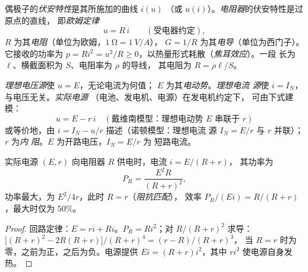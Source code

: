 \begin{definition}\label{def:b1:dc-circuits:resistor}
偶极子的\emph{伏安特性}是其所施加的曲线 $i(u)$
（或 $u(i)$）。\emph{电阻器}的伏安特性是过原点的直线，
即\emph{欧姆定律}
\[
u = R\,i \qquad (\text{受电器约定}),
\]
$R$ 为其\emph{电阻}（单位为欧姆，$\qty{1}{\ohm} = \qty{1}{V/A}$），
$G = 1/R$ 为其\emph{电导}（单位为西门子）。它接收的功率为 $p = Ri^2 =
u^2/R \geq 0$，以热量形式耗散（\emph{焦耳效应}）。一段
长为 $\ell$、横截面积为 $S$、电阻率为 $\rho$ 的导线，
其电阻为 $R = \rho\ell/S$。
\end{definition}

\begin{definition}[理想电源与实际电源]\label{def:b1:dc-circuits:sources}
\emph{理想电压源}使 $u = E$，无论电流为何值；
$E$ 为其\emph{电动势}。\emph{理想电流
源}使 $i = I_N$，与电压无关。\emph{实际电源}
（电池、发电机、电源）在发电机约定下，
可由下式建模：
\[
u = E - r\,i \quad (\text{戴维南模型：理想电动势 } E \text{ 串联于 } r)
\]
或等价地，由 $i = I_N - u/r$ 描述（诺顿模型：理想电流
源 $I_N = E/r$ 与 $r$ 并联）；$r$ 为\emph{内
阻}。$E$ 为开路电压，$I_N = E/r$ 为
短路电流。
\end{definition}

\begin{proposition}[实际电源的功率平衡]\label{prop:b1:dc-circuits:sourcepower}
实际电源 $(E, r)$ 向电阻器 $R$ 供电时，电流 $i = E/(R + r)$，
其功率为
\[
P_R = \frac{E^2 R}{(R + r)^2},
\]
功率最大，为 $E^2/4r$，此时 $R = r$（\emph{阻抗匹配}），
效率 $P_R/(Ei) = R/(R + r)$，最大时仅为 $50\%$。
\end{proposition}

\begin{proof}
回路定律：$E = ri + Ri$。$P_R = Ri^2$；对 $R/(R + r)^2$ 求导：
$\big[(R + r)^2 - 2R(R + r)\big]/(R + r)^4 = (r - R)/(R + r)^3$，
当 $R = r$ 时为零，之前为正，之后为负。电源提供
$Ei = (R + r)i^2$，其中 $ri^2$ 使电源自身发热。
\end{proof}

